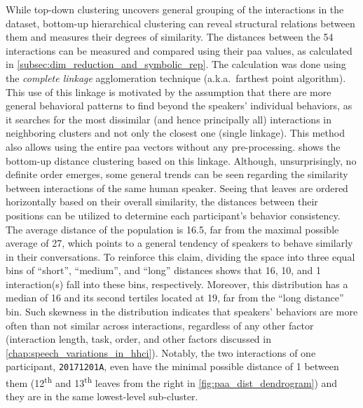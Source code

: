 While top-down clustering uncovers general grouping of the interactions in the dataset, bottom-up hierarchical clustering can reveal structural relations between them and measures their degrees of similarity.
The distances between the 54 interactions can be measured and compared using their \ac{paa} values, as calculated in \cref{subsec:dim_reduction_and_symbolic_rep}.
The calculation was done using the \emph{complete linkage} agglomeration technique (a.k.a.\ farthest point algorithm).
This use of this linkage is motivated by the assumption that there are more general behavioral patterns to find beyond the speakers' individual behaviors, as it searches for the most dissimilar (and hence principally all) interactions in neighboring clusters and not only the closest one (single linkage).
This method also allows using the entire \ac{paa} vectors without any pre-processing.
 shows the bottom-up distance clustering based on this linkage.
Although, unsurprisingly, no definite order emerges, some general trends can be seen regarding the similarity between interactions of the same human speaker.
Seeing that leaves are ordered horizontally based on their overall similarity, the distances between their positions can be utilized to determine each participant's behavior consistency.
The average distance of the population is 16.5, far from the maximal possible average of 27, which points to a general tendency of speakers to behave similarly in their conversations.
To reinforce this claim, dividing the space into three equal bins of \enquote{short}, \enquote{medium}, and \enquote{long} distances shows that 16, 10, and 1 interaction(s) fall into these bins, respectively.
Moreover, this distribution has a median of 16 and its second tertiles located at 19, far from the \enquote{long distance} bin.
Such skewness in the distribution indicates that speakers' behaviors are more often than not similar across interactions, regardless of any other factor (interaction length, task, order, and other factors discussed in \cref{chap:speech_variations_in_hhci}).
Notably, the two interactions of one participant, \texttt{20171201A}, even have the minimal possible distance of 1 between them (12\textsuperscript{th} and 13\textsuperscript{th} leaves from the right in \cref{fig:paa_dist_dendrogram}) and they are in the same lowest-level sub-cluster.

